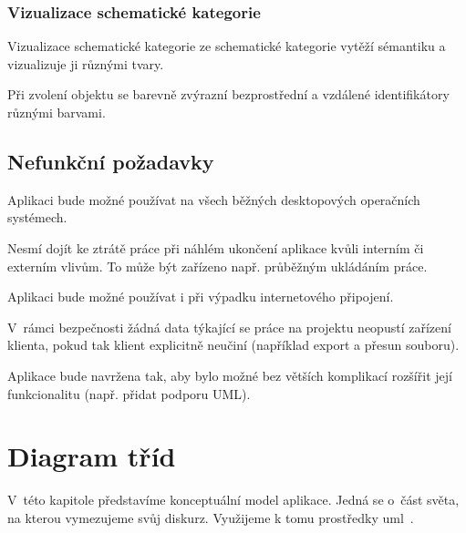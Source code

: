 \subsubsection*{Vizualizace schematické kategorie}
\begin{enumfp}[resume]
  \item Vizualizace schematické kategorie ze schematické kategorie vytěží sémantiku a vizualizuje ji různými tvary.
  \item Při zvolení objektu se barevně zvýrazní bezprostřední a vzdálené identifikátory různými barvami.
\end{enumfp}

\subsection{Nefunkční požadavky}

\begin{enumnfp}
  \item Aplikaci bude možné používat na všech běžných desktopových operačních systémech.
  \item Nesmí dojít ke ztrátě práce při náhlém ukončení aplikace kvůli interním či externím vlivům.
  To může být zařízeno např. průběžným ukládáním práce.
  \item Aplikaci bude možné používat i při výpadku internetového připojení.
  \item V~rámci bezpečnosti žádná data týkající se práce na projektu neopustí zařízení klienta, pokud tak klient explicitně neučiní (například export a přesun souboru).
  \item Aplikace bude navržena tak, aby bylo možné bez větších komplikací rozšířit její funkcionalitu (např. přidat podporu UML).
\end{enumnfp}

\section{Diagram tříd}

V~této kapitole představíme konceptuální model aplikace.
Jedná se o~část světa, na kterou vymezujeme svůj diskurz.
Využijeme k tomu prostředky \acrfull{uml}~\cite{omg_uml_2017}.


